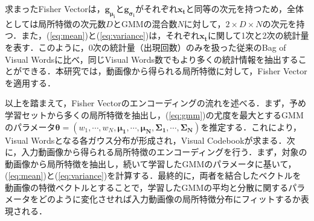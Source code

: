 求まったFisher Vectorは，$ \bm{g_{\mu_i}} $と$ \bm{g_{\sigma_i}} $がそれぞれ$ \bm{x_t} $と同等の次元を持つため，全体としては局所特徴の次元数$ D $とGMMの混合数$ N $に対して，$ 2\times{D}\times{N} $の次元を持つ．また，(\ref{eq:mean})と(\ref{eq:variance})は，それぞれ$ \bm{x_t} $に関して1次と2次の統計量を表す．このように，0次の統計量（出現回数）のみを扱った従来のBag of Visual Wordsに比べ，同じVisual Words数でもより多くの統計情報を抽出することができる．本研究では，動画像から得られる局所特徴に対して，Fisher Vectorを適用する．

以上を踏まえて，Fisher Vectorのエンコーディングの流れを述べる．まず，予め学習セットから多くの局所特徴を抽出し，(\ref{eq:gmm})の尤度を最大とするGMMのパラメータ$ \bm{\theta} = (w_1,\cdots,w_N,\bm{\mu_1},\cdots,\bm{\mu_N},\bm{\Sigma_1},\cdots,\bm{\Sigma_N}) $を推定する．これにより，Visual Wordsとなる各ガウス分布が形成され，Visual Codebookが求まる．次に，入力動画像から得られる局所特徴のエンコーディングを行う．まず，対象の動画像から局所特徴を抽出し，続いて学習したGMMのパラメータに基いて，(\ref{eq:mean})と(\ref{eq:variance})を計算する．最終的に，両者を結合したベクトルを動画像の特徴ベクトルとすることで，学習したGMMの平均と分散に関するパラメータをどのように変化させれば入力動画像の局所特徴分布にフィットするか表現される．

